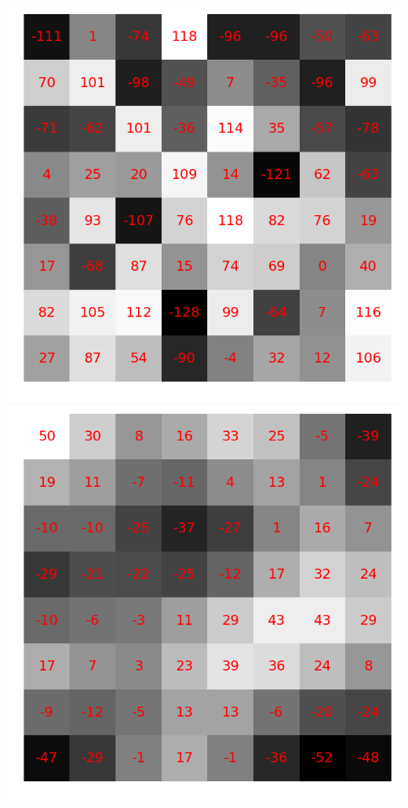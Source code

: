 \documentclass{beamer}
\begin{document}
\begin{frame}
    \begin{center}
        \includegraphics[scale=0.12]{fig/8x8random0.png}
        \hspace{0.5cm}
        \includegraphics[scale=0.12]{fig/8x8random1.png}

\end{center}
\end{frame}
\end{document}
